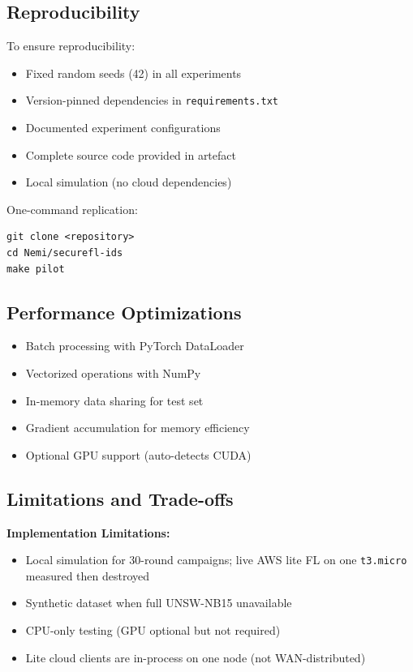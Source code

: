 \subsection{Reproducibility}

To ensure reproducibility:

\begin{itemize}
    \item Fixed random seeds (42) in all experiments
    \item Version-pinned dependencies in \texttt{requirements.txt}
    \item Documented experiment configurations
    \item Complete source code provided in artefact
    \item Local simulation (no cloud dependencies)
\end{itemize}

One-command replication:
\begin{verbatim}
git clone <repository>
cd Nemi/securefl-ids
make pilot
\end{verbatim}

\subsection{Performance Optimizations}

\begin{itemize}
    \item Batch processing with PyTorch DataLoader
    \item Vectorized operations with NumPy
    \item In-memory data sharing for test set
    \item Gradient accumulation for memory efficiency
    \item Optional GPU support (auto-detects CUDA)
\end{itemize}

\subsection{Limitations and Trade-offs}

\textbf{Implementation Limitations:}

\begin{itemize}
    \item Local simulation for 30-round campaigns; live AWS lite FL on one \texttt{t3.micro} measured then destroyed
    \item Synthetic dataset when full UNSW-NB15 unavailable
    \item CPU-only testing (GPU optional but not required)
    \item Lite cloud clients are in-process on one node (not WAN-distributed)
\end{itemize}


